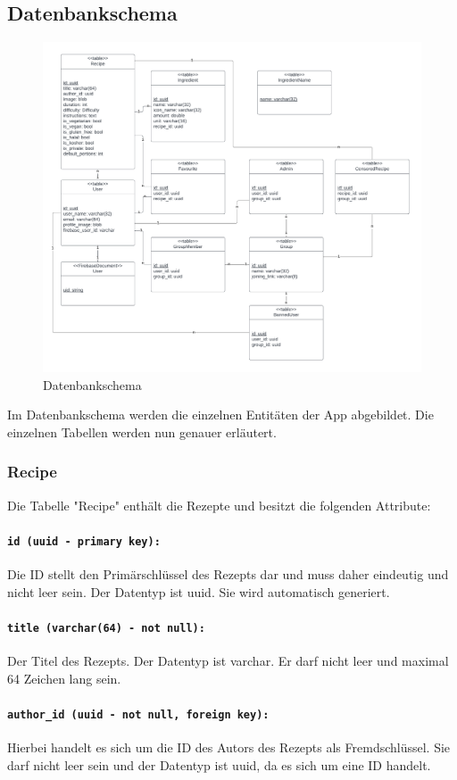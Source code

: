 \documentclass{entwurfsheft}
\begin{document}
\subsection{Datenbankschema}
\begin{figure}[htp]
    \centering
    \includegraphics[width = \linewidth]{images/database/databaseSchema.pdf}
    \caption{Datenbankschema}
\end{figure}
Im Datenbankschema werden die einzelnen Entitäten der App abgebildet. Die einzelnen Tabellen werden nun genauer erläutert.
\newpage
\subsubsection{Recipe}
Die Tabelle "Recipe" enthält die Rezepte und besitzt die folgenden Attribute:
\paragraph{\texttt{id (uuid - primary key):}} Die ID stellt den Primärschlüssel des Rezepts dar und muss daher eindeutig und nicht leer sein. Der Datentyp ist \Gls{uuid}. Sie wird automatisch generiert.
\paragraph{\texttt{title (varchar(64) - not null):}} Der Titel des Rezepts. Der Datentyp ist \Gls{varchar}. Er darf nicht leer und maximal 64 Zeichen lang sein.
\paragraph{\texttt{author\_id (uuid - not null, foreign key):}} Hierbei handelt es sich um die ID des Autors des Rezepts als Fremdschlüssel. Sie darf nicht leer sein und der Datentyp ist \Gls{uuid}, da es sich um eine ID handelt.
\end{document}

